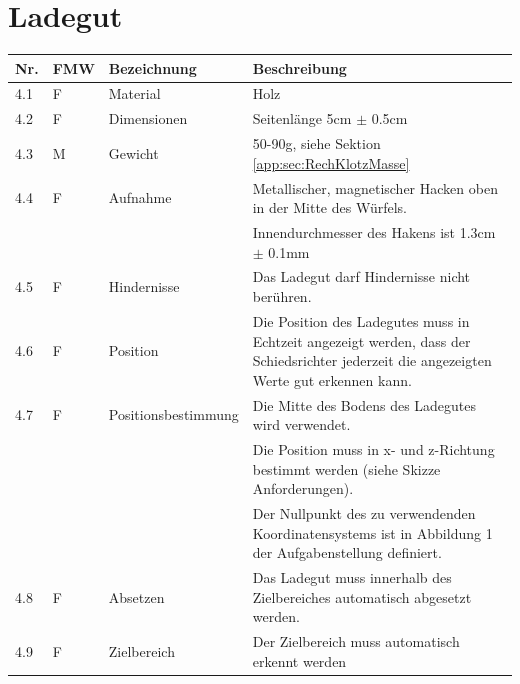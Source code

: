 \documentclass[a4paper]{report}
\begin{document}
\section{Ladegut}
\label{app:sec:AnfLadegut}
\begin{tabular}{|p{}|p{}|p{}|p{}|}
	\hline
	\textbf{Nr.} & \textbf{FMW\footnotemark} & \textbf{Bezeichnung} & \textbf{Beschreibung} \\
	\hline
	4.1 & F & Material & Holz \\
	\hline
	4.2 & F &  Dimensionen & Seitenlänge 5cm $\pm$ 0.5cm \\
	\hline
	4.3 & M & Gewicht & 50-90g, siehe Sektion \ref{app:sec:RechKlotzMasse} \\
	\hline
	4.4 & F & Aufnahme & Metallischer, magnetischer Hacken oben in der Mitte des Würfels.\\
	& & & Innendurchmesser des Hakens ist 1.3cm $\pm$ 0.1mm\\
	\hline
	4.5 & F & Hindernisse & Das Ladegut darf Hindernisse nicht berühren. \\
	\hline
	4.6 & F & Position & Die Position des Ladegutes muss in Echtzeit angezeigt werden, dass der Schiedsrichter jederzeit die angezeigten Werte gut erkennen kann.\\
	\hline
	4.7 & F & Positionsbestimmung & Die Mitte des Bodens des Ladegutes wird verwendet.\\
	& & & Die Position muss in x- und z-Richtung bestimmt werden (siehe Skizze Anforderungen).\\
	& & & Der Nullpunkt des zu verwendenden Koordinatensystems ist in Abbildung 1 der Aufgabenstellung definiert. \\
	\hline
	4.8 & F & Absetzen & Das Ladegut muss innerhalb des Zielbereiches automatisch abgesetzt werden. \\
	\hline
	4.9 & F & Zielbereich & Der Zielbereich muss automatisch erkennt werden\\
	\hline
\end{tabular}
\end{document}
